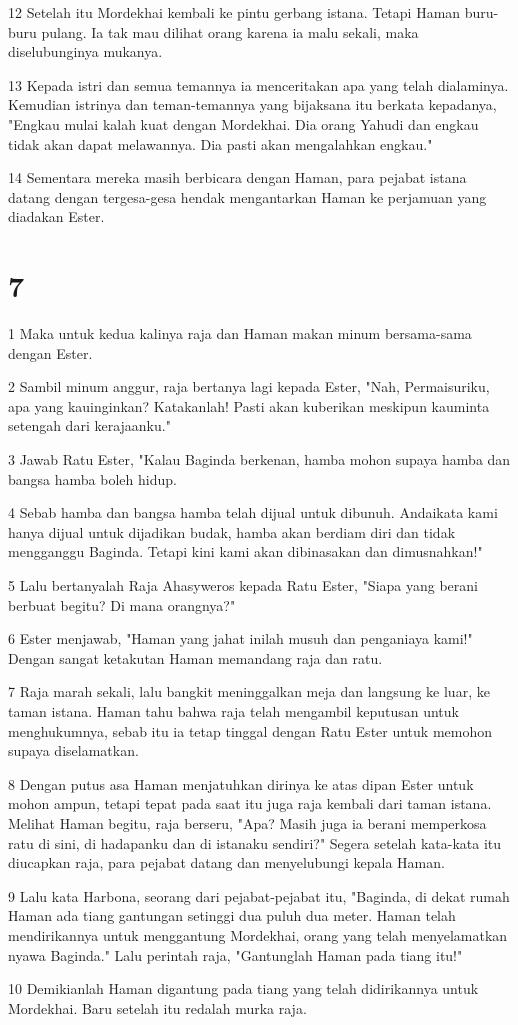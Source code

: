 \par 12 Setelah itu Mordekhai kembali ke pintu gerbang istana. Tetapi Haman buru-buru pulang. Ia tak mau dilihat orang karena ia malu sekali, maka diselubunginya mukanya.
\par 13 Kepada istri dan semua temannya ia menceritakan apa yang telah dialaminya. Kemudian istrinya dan teman-temannya yang bijaksana itu berkata kepadanya, "Engkau mulai kalah kuat dengan Mordekhai. Dia orang Yahudi dan engkau tidak akan dapat melawannya. Dia pasti akan mengalahkan engkau."
\par 14 Sementara mereka masih berbicara dengan Haman, para pejabat istana datang dengan tergesa-gesa hendak mengantarkan Haman ke perjamuan yang diadakan Ester.

\chapter{7}

\par 1 Maka untuk kedua kalinya raja dan Haman makan minum bersama-sama dengan Ester.
\par 2 Sambil minum anggur, raja bertanya lagi kepada Ester, "Nah, Permaisuriku, apa yang kauinginkan? Katakanlah! Pasti akan kuberikan meskipun kauminta setengah dari kerajaanku."
\par 3 Jawab Ratu Ester, "Kalau Baginda berkenan, hamba mohon supaya hamba dan bangsa hamba boleh hidup.
\par 4 Sebab hamba dan bangsa hamba telah dijual untuk dibunuh. Andaikata kami hanya dijual untuk dijadikan budak, hamba akan berdiam diri dan tidak mengganggu Baginda. Tetapi kini kami akan dibinasakan dan dimusnahkan!"
\par 5 Lalu bertanyalah Raja Ahasyweros kepada Ratu Ester, "Siapa yang berani berbuat begitu? Di mana orangnya?"
\par 6 Ester menjawab, "Haman yang jahat inilah musuh dan penganiaya kami!" Dengan sangat ketakutan Haman memandang raja dan ratu.
\par 7 Raja marah sekali, lalu bangkit meninggalkan meja dan langsung ke luar, ke taman istana. Haman tahu bahwa raja telah mengambil keputusan untuk menghukumnya, sebab itu ia tetap tinggal dengan Ratu Ester untuk memohon supaya diselamatkan.
\par 8 Dengan putus asa Haman menjatuhkan dirinya ke atas dipan Ester untuk mohon ampun, tetapi tepat pada saat itu juga raja kembali dari taman istana. Melihat Haman begitu, raja berseru, "Apa? Masih juga ia berani memperkosa ratu di sini, di hadapanku dan di istanaku sendiri?" Segera setelah kata-kata itu diucapkan raja, para pejabat datang dan menyelubungi kepala Haman.
\par 9 Lalu kata Harbona, seorang dari pejabat-pejabat itu, "Baginda, di dekat rumah Haman ada tiang gantungan setinggi dua puluh dua meter. Haman telah mendirikannya untuk menggantung Mordekhai, orang yang telah menyelamatkan nyawa Baginda." Lalu perintah raja, "Gantunglah Haman pada tiang itu!"
\par 10 Demikianlah Haman digantung pada tiang yang telah didirikannya untuk Mordekhai. Baru setelah itu redalah murka raja.

